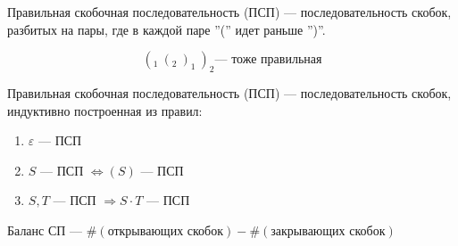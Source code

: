 \begin{definition}
    Правильная скобочная последовательность (ПСП) --- последовательность скобок, разбитых на пары, где в каждой паре ''('' идет раньше '')''.
\end{definition}
$$(_1\ (_2\ )_1\ )_2 \text{--- тоже правильная}$$

\begin{definition}
    Правильная скобочная последовательность (ПСП) --- последовательность скобок, индуктивно построенная из правил: 
\end{definition}
\begin{enumerate}
    \item $\varepsilon$ --- ПСП
    \item $S$ --- ПСП $\Leftrightarrow (S)$ --- ПСП
    \item $S, T$ --- ПСП $\Rightarrow S\cdot T$ --- ПСП
\end{enumerate}

\begin{definition}
    Баланс СП --- \(\#(\text{открывающих скобок}) - \#(\text{закрывающих скобок})\)
\end{definition}

